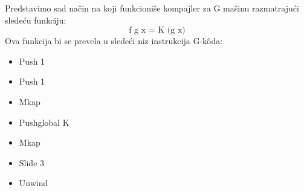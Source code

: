 \begin{primer}
	Predstavimo sad način na koji funkcioniše kompajler za G mašinu razmatrajući sledeću funkciju:
	$$\text{f g x = K (g x)}$$
	Ova funkcija bi se prevela u sledeći niz instrukcija G-k\^ oda:
	\begin{itemize}
	\item Push 1
	\item Push 1
	\item Mkap
	\item Pushglobal K
	\item Mkap
	\item Slide 3
	\item Unwind
	\end{itemize}
\end{primer}

